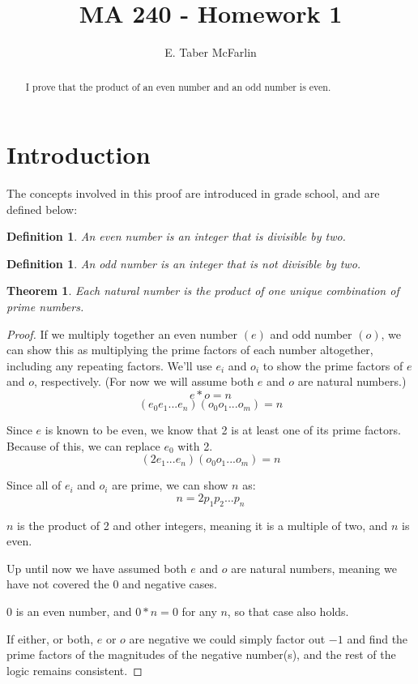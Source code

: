 \documentclass[12pt,a4paper,reqno,parskip=full]{amsart}
\numberwithin{equation}{section}
\theoremstyle{plain}
\newtheorem{theorem}[subsection]{Theorem}
\newtheorem{definition}[subsection]{Definition}
\theoremstyle{definition}
\begin{document}
\title{MA 240 - Homework 1}

\author{E. Taber McFarlin}

\begin{abstract}
  I prove that the product of an even number and an odd number is even.
\end{abstract}

\maketitle


\section{Introduction}

The concepts involved in this proof are introduced in grade school, and are defined below:

\begin{definition}
  An even number is an integer that is divisible by two.
\end{definition}

\begin{definition}
  An odd number is an integer that is not divisible by two.
\end{definition}

\begin{theorem}
  Each natural number is the product of one unique combination of prime numbers.
\end{theorem}

\begin{proof}
  If we multiply together an even number $(e)$ and odd number $(o)$, we can show this as multiplying the prime factors of each number altogether, including any repeating factors. We'll use $e_i$ and $o_i$ to show the prime factors of $e$ and $o$, respectively. (For now we will assume both $e$ and $o$ are natural numbers.)
  \[
    e * o = n
  \]
  \[
    (e_0 e_1 ... e_n)(o_0 o_1 ... o_m) = n
  \]

  Since $e$ is known to be even, we know that 2 is at least one of its prime factors. Because of this, we can replace $e_0$ with 2.
  \[
    (2 e_1 ... e_n)(o_0 o_1 ... o_m) = n
  \]

  Since all of $e_i$ and $o_i$ are prime, we can show $n$ as:
  \[
    n = 2 p_1 p_2 ... p_n
  \]

  $n$ is the product of 2 and other integers, meaning it is a multiple of two, and $n$ is even.

  Up until now we have assumed both $e$ and $o$ are natural numbers, meaning we have not covered the 0 and negative cases. 
  
  0 is an even number, and $0 * n = 0$ for any $n$, so that case also holds.

  If either, or both, $e$ or $o$ are negative we could simply factor out $-1$ and find the prime factors of the magnitudes of the negative number(s), and the rest of the logic remains consistent.
\end{proof} 
\end{document}
